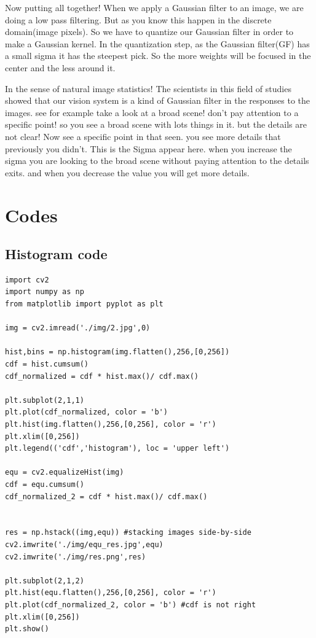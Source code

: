 \documentclass[a4paper]{article}
\begin{document}
Now putting all together! When we apply a Gaussian filter to an image,
we are doing a low pass filtering. But as you know this happen in the discrete domain(image pixels).
So we have to quantize our Gaussian filter in order to make a Gaussian kernel. In the quantization step,
as the Gaussian filter(GF) has a small sigma it has the steepest pick.
So the more weights will be focused in the center and the less around it.


In the sense of natural image statistics!
The scientists in this field of studies showed that our vision system is a kind of Gaussian filter in the responses to the images.
see for example take a look at a broad scene! don't pay attention to a specific point!
so you see a broad scene with lots things in it. but the details are not clear!
Now see a specific point in that seen. you see more details that previously you didn't.
This is the Sigma appear here. when you increase the sigma you are looking to the broad scene without paying attention
to the details exits. and when you decrease the value you will get more details.


\section{Codes}
\label{sec:orge68e3f3}

\subsection{Histogram code}
\label{sec:org48be7a5}

\begin{verbatim}
import cv2
import numpy as np
from matplotlib import pyplot as plt

img = cv2.imread('./img/2.jpg',0)

hist,bins = np.histogram(img.flatten(),256,[0,256])
cdf = hist.cumsum()
cdf_normalized = cdf * hist.max()/ cdf.max()

plt.subplot(2,1,1)
plt.plot(cdf_normalized, color = 'b')
plt.hist(img.flatten(),256,[0,256], color = 'r')
plt.xlim([0,256])
plt.legend(('cdf','histogram'), loc = 'upper left')

equ = cv2.equalizeHist(img) 
cdf = equ.cumsum()
cdf_normalized_2 = cdf * hist.max()/ cdf.max()


res = np.hstack((img,equ)) #stacking images side-by-side
cv2.imwrite('./img/equ_res.jpg',equ)
cv2.imwrite('./img/res.png',res)

plt.subplot(2,1,2)
plt.hist(equ.flatten(),256,[0,256], color = 'r')
plt.plot(cdf_normalized_2, color = 'b') #cdf is not right 
plt.xlim([0,256])
plt.show()
\end{verbatim}
\end{document}
